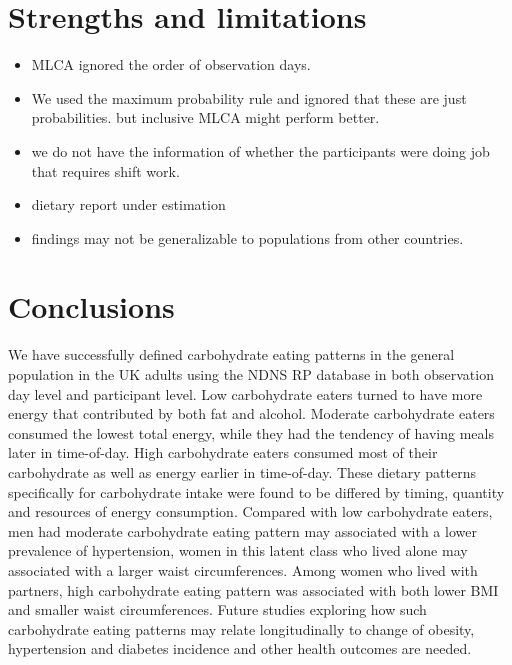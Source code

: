 










\section{Strengths and limitations}



\begin{itemize}
	\item MLCA ignored the order of observation days.
	\item We used the maximum probability rule and ignored that these are just probabilities. but inclusive MLCA might perform better.
	\item we do not have the information of whether the participants were doing job that requires shift work.
	\item dietary report under estimation
	\item findings may not be generalizable to populations from other countries.
\end{itemize}



\section{Conclusions}

We have successfully defined carbohydrate eating patterns in the general population in the UK adults using the NDNS RP database in both observation day level and participant level. Low carbohydrate eaters turned to have more energy that contributed by both fat and alcohol. Moderate carbohydrate eaters consumed the lowest total energy, while they had the tendency of having meals later in time-of-day. High carbohydrate eaters consumed most of their carbohydrate as well as energy earlier in time-of-day. These dietary patterns specifically for carbohydrate intake were found to be differed by timing, quantity and resources of energy consumption. Compared with low carbohydrate eaters, men had moderate carbohydrate eating pattern may associated with a lower prevalence of hypertension, women in this latent class who lived alone may associated with a larger waist circumferences. Among women who lived with partners, high carbohydrate eating pattern was associated with both lower BMI and smaller waist circumferences. Future studies exploring how such carbohydrate eating patterns may relate longitudinally to change of obesity, hypertension and diabetes incidence and other health outcomes are needed.